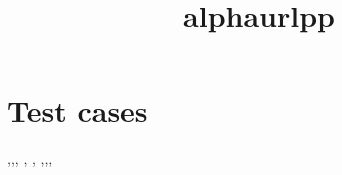 \documentclass[11pt]{article}
\begin{document}
\title{alphaurlpp}
\maketitle

\section{Test cases}

\cite{Plain},\cite{onlydoi},\cite{onlyurl}, \cite{urldoi}, \cite{onlyeccc}, \cite{onlyeprint},\cite{ECCCandConf},\cite{ECCCandConfandDOI}, \cite{eprinteccc}



\end{document}
